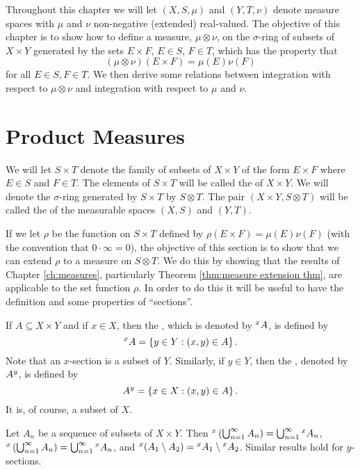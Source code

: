 

Throughout this chapter we will let $(X,S,\mu)$ and $(Y,T,\nu)$ denote measure spaces with $\mu$ and $\nu$ non-negative (extended) real-valued. The objective of this chapter is to show how to define a measure, $\mu\otimes\nu$, on the $\sigma$-ring of subsets of $X\times Y$ generated by the sets $E\times F$, $E\in S$, $F\in T$, which has the property that $$(\mu\otimes\nu)(E\times F)=\mu(E)\nu(F)$$ for all $E\in S,F\in T$. We then derive some relations between integration with respect to $\mu\otimes\nu$ and integration with respect to $\mu$ and $\nu$.

\section{Product Measures}

\begin{definition}
We will let $S\times T$ denote the family of subsets of $X\times Y$ of the form $E\times F$ where $E\in S$ and $F\in T$. The elements of $S\times T$ will be called the  of $X\times Y$. We will denote the $\sigma$-ring generated by $S\times T$ by $S\otimes T$. The pair $(X\times Y,S\otimes T)$ will be called the  of the measurable spaces $(X,S)$ and $(Y,T)$.
\end{definition}

If we let $\rho$ be the function on $S\times T$ defined by $\rho(E\times F)=\mu(E)\nu(F)$ (with the convention that $0\cdot\infty=0$), the objective of this section is to show that we can extend $\rho$ to a measure on $S\otimes T$. We do this by showing that the results of Chapter \ref{ch:measures}, particularly Theorem \ref{thm:measure extension thm}, are applicable to the set function $\rho$. In order to do this it will be useful to have the definition and some properties of ``sections''.

\begin{definition}
If $A\subseteq X\times Y$ and if $x\in X$, then the , which is denoted by $\xsec{A}{x}$, is defined by $$\xsec{A}{x}=\brc{y\in Y:(x, y)\in A}.$$ Note that an $x$-section is a subset of $Y$. Similarly, if $y\in Y$, then the , denoted by $\ysec{A}{y}$, is defined by $$\ysec{A}{y}=\brc{x\in X:(x,y)\in A}.$$ It is, of course, a subset of $X$.
\end{definition}

\begin{proposition}\label{prop:section preserve union intersection}
Let $A_n$ be a sequence of subsets of $X\times Y$. Then $\xsec{\br{\bigcup_{n=1}^\infty A_n}}{x}=\bigcup_{n=1}^\infty\xsec{A_n}{x}$, $\xsec{\br{\bigcup_{n=1}^\infty A_n}}{x}=\bigcup_{n=1}^\infty\xsec{A_n}{x}$, and $\xsec{(A_1\sd A_2)}{x}=\xsec{A_1}{x}\sd\xsec{A_2}{x}$. Similar results hold for $y$-sections.
\end{proposition}

